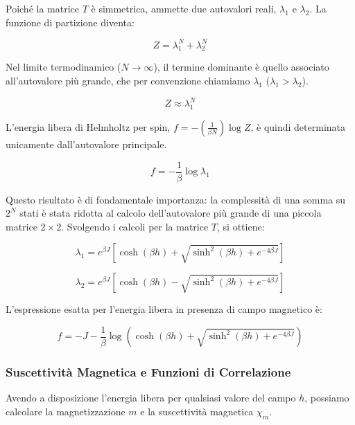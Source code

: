 Poiché la matrice $T$ è simmetrica, ammette due autovalori reali, $\lambda_1$ e $\lambda_2$. La funzione di partizione diventa:

\begin{equation}
Z = \lambda_1^N + \lambda_2^N
\end{equation}

Nel limite termodinamico ($N \to \infty$), il termine dominante è quello associato all'autovalore più grande, che per convenzione chiamiamo $\lambda_1$ ($\lambda_1 > \lambda_2$).

\begin{equation}
Z \approx \lambda_1^N
\end{equation}

L'energia libera di Helmholtz per spin, $f = - (\frac{1}{\beta N}) \log Z$, è quindi determinata unicamente dall'autovalore principale.

\begin{equation}
f = -\frac{1}{\beta} \log \lambda_1
\end{equation}

Questo risultato è di fondamentale importanza: la complessità di una somma su $2^N$ stati è stata ridotta al calcolo dell'autovalore più grande di una piccola matrice $2 \times 2$. Svolgendo i calcoli per la matrice $T$, si ottiene:

\begin{equation}
    \lambda_1 = e^{\beta J} \left[\cosh(\beta h) + \sqrt{\sinh^2(\beta h) + e^{-4\beta J}}\right]
\end{equation}

\begin{equation}
    \lambda_2 = e^{\beta J} \left[\cosh(\beta h) - \sqrt{\sinh^2(\beta h) + e^{-4\beta J}}\right]
\end{equation}

L'espressione esatta per l'energia libera in presenza di campo magnetico è:

\begin{equation}
f = -J - \frac{1}{\beta} \log \left( \cosh(\beta h) + \sqrt{\sinh^2(\beta h) + e^{-4\beta J}} \right)
\end{equation}

\subsubsection{Suscettività Magnetica e Funzioni di Correlazione}

Avendo a disposizione l'energia libera per qualsiasi valore del campo $h$, possiamo calcolare la magnetizzazione $m$ e la suscettività magnetica $\chi_m$.

